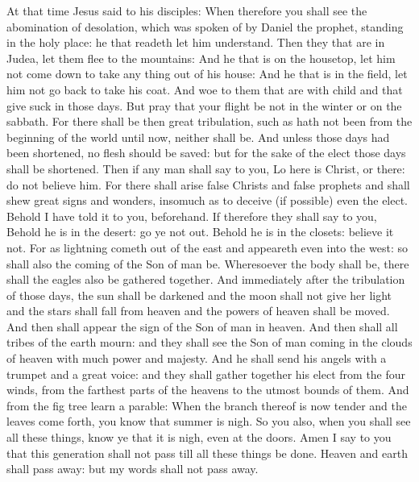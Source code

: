 At that time Jesus said to his disciples:
When therefore you shall see the abomination of desolation, which
was spoken of by Daniel the prophet, standing in the holy place: he that
readeth let him understand.
Then they that are in Judea, let them flee to the mountains:
And he that is on the housetop, let him not come down to take any
thing out of his house:
And he that is in the field, let him not go back to take his
coat.
And woe to them that are with child and that give suck in those
days.
But pray that your flight be not in the winter or on the sabbath.
For there shall be then great tribulation, such as hath not been
from the beginning of the world until now, neither shall be.
And unless those days had been shortened, no flesh should be
saved: but for the sake of the elect those days shall be shortened.
Then if any man shall say to you, Lo here is Christ, or there: do
not believe him.
For there shall arise false Christs and false prophets and shall
shew great signs and wonders, insomuch as to deceive (if possible) even
the elect.
Behold I have told it to you, beforehand.
If therefore they shall say to you, Behold he is in the desert:
go ye not out. Behold he is in the closets: believe it not.
For as lightning cometh out of the east and appeareth even into
the west: so shall also the coming of the Son of man be.
Wheresoever the body shall be, there shall the eagles also be
gathered together.
And immediately after the tribulation of those days, the sun
shall be darkened and the moon shall not give her light and the stars
shall fall from heaven and the powers of heaven shall be moved.
And then shall appear the sign of the Son of man in heaven.  And
then shall all tribes of the earth mourn: and they shall see the Son of
man coming in the clouds of heaven with much power and majesty.
And he shall send his angels with a trumpet and a great voice:
and they shall gather together his elect from the four winds, from the
farthest parts of the heavens to the utmost bounds of them.
And from the fig tree learn a parable: When the branch thereof is
now tender and the leaves come forth, you know that summer is nigh.
So you also, when you shall see all these things, know ye that it
is nigh, even at the doors.
Amen I say to you that this generation shall not pass till all
these things be done.
Heaven and earth shall pass away: but my words shall not pass away.




